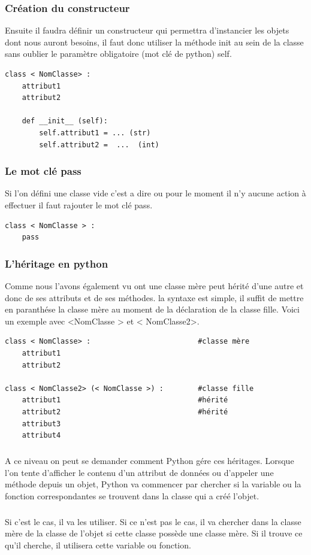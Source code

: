 \documentclass[a4paper, 12pt, twoside]{article}
\begin{document}
{{{{{\subsubsection{Création du constructeur}{Ensuite il faudra définir un constructeur qui permettra d'instancier les objets dont nous auront besoins, il faut donc utiliser la méthode  \textsf{init} au sein de la classe sans oublier le paramètre obligatoire (mot clé de python) \textsf{self}. }

\begin{verbatim}
class < NomClasse> : 
    attribut1
    attribut2 

    def __init__ (self):
        self.attribut1 = ... (str)
        self.attribut2 =  ...  (int)
\end{verbatim}

\subsubsection{Le mot clé pass}{Si l'on défini une classe vide c'est a dire ou pour le moment il n'y aucune action à effectuer il faut rajouter le mot clé \textsf{pass}.}
\begin{verbatim}
class < NomClasse > : 
    pass 
\end{verbatim}
\subsubsection{L'héritage en python}{Comme nous l'avons également vu ont une classe mère peut hérité d'une autre et donc de ses attributs et de ses méthodes. la syntaxe est simple, il suffit de mettre en paranthése la classe mère au moment de la déclaration de la classe fille. Voici un exemple avec <NomClasse > et < NomClasse2>.}
\begin{verbatim}
class < NomClasse> :                         #classe mère
    attribut1
    attribut2 

class < NomClasse2> (< NomClasse >) :        #classe fille
    attribut1                                #hérité 
    attribut2                                #hérité 
    attribut3   
    attribut4
\end{verbatim}
\subparagraph{}{A ce niveau on peut se demander comment Python gére ces héritages. Lorsque l'on tente d'afficher le contenu d'un attribut de données ou d'appeler une méthode depuis un objet, Python va commencer par chercher si la variable ou la fonction correspondantes se trouvent dans la classe qui a créé l'objet.}

\subparagraph{}{Si c'est le cas, il va les utiliser. Si ce n'est pas le cas, il va chercher dans la classe mère de la classe de l'objet si cette classe possède une classe mère. Si il trouve ce qu’il cherche, il utilisera cette variable ou fonction.}

}}}}}
\end{document}
